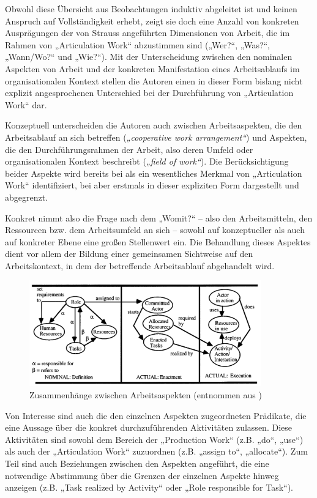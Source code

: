 Obwohl diese Übersicht aus Beobachtungen induktiv abgeleitet ist und keinen Anspruch auf Vollständigkeit erhebt, zeigt sie doch eine Anzahl von konkreten Ausprägungen der von Strauss angeführten Dimensionen von Arbeit, die im Rahmen von „Articulation Work“ abzustimmen sind („Wer?“, „Was?“, „Wann/Wo?“ und „Wie?“). Mit der Unterscheidung zwischen den nominalen Aspekten von Arbeit und der konkreten Manifestation eines Arbeitsablaufs im organisationalen Kontext stellen die Autoren einen in dieser Form bislang nicht explizit angesprochenen Unterschied bei der Durchführung von „Articulation Work“ dar.

Konzeptuell unterscheiden die Autoren auch zwischen Arbeitsaspekten, die den Arbeitsablauf an sich betreffen (\emph{„cooperative work arrangement“}) und Aspekten, die den Durchführungsrahmen der Arbeit, also deren Umfeld oder organisationalen Kontext beschreibt (\emph{„field of work“}). Die Berücksichtigung beider Aspekte wird bereits bei \citet{Strauss88} als ein wesentliches Merkmal von „Articulation Work“ identifiziert, bei \citet{Schmidt96} aber erstmals in dieser expliziten Form dargestellt und abgegrenzt.

Konkret nimmt also die Frage nach dem „Womit?“ -- also den Arbeitsmitteln, den Ressourcen bzw. dem Arbeitsumfeld an sich --  sowohl auf konzeptueller als auch auf konkreter Ebene eine großen Stellenwert ein. Die Behandlung dieses Aspektes dient vor allem der Bildung einer gemeinsamen Sichtweise auf den Arbeitskontext, in dem der betreffende Arbeitsablauf abgehandelt wird.

\begin{figure}[htbp]
	\centering
		\includegraphics[width=10cm]{img/ArticulationWork/divitini00_caw.png}
	\caption[Zusammenhänge zwischen Arbeitsaspekten]{Zusammenhänge zwischen Arbeitsaspekten (entnommen aus \citep{Divitini00})}
	\label{fig:img_ArticulationWork_divitini00_caw}
\end{figure}

Von Interesse sind auch die den einzelnen Aspekten zugeordneten Prädikate, die eine Aussage über die konkret durchzuführenden Aktivitäten zulassen. Diese Aktivitäten sind sowohl dem Bereich der „Production Work“ (z.B. „do“, „use“) als auch der „Articulation Work“ zuzuordnen (z.B. „assign to“, „allocate“). Zum Teil sind auch Beziehungen zwischen den Aspekten angeführt, die eine notwendige Abstimmung über die Grenzen der einzelnen Aspekte hinweg anzeigen (z.B. „Task realized by Activity“ oder „Role responsible for Task“).

